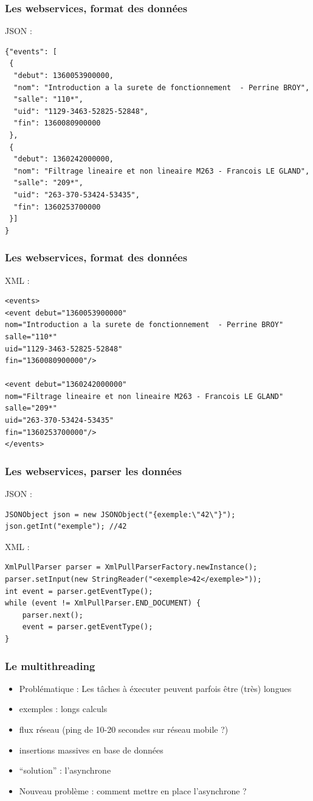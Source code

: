 \documentclass{beamer}
\begin{document}
\begin{frame}[fragile]
\frametitle{Les webservices, format des données}
JSON :
\begin{lstlisting}
{"events": [
 {
  "debut": 1360053900000,
  "nom": "Introduction a la surete de fonctionnement  - Perrine BROY",
  "salle": "110*",
  "uid": "1129-3463-52825-52848",
  "fin": 1360080900000
 },
 {
  "debut": 1360242000000,
  "nom": "Filtrage lineaire et non lineaire M263 - Francois LE GLAND",
  "salle": "209*",
  "uid": "263-370-53424-53435",
  "fin": 1360253700000
 }]
}
\end{lstlisting}
\end{frame}
\begin{frame}[fragile]
\frametitle{Les webservices, format des données}
XML :
\begin{lstlisting}
<events>
<event debut="1360053900000" 
nom="Introduction a la surete de fonctionnement  - Perrine BROY"
salle="110*" 
uid="1129-3463-52825-52848" 
fin="1360080900000"/>

<event debut="1360242000000" 
nom="Filtrage lineaire et non lineaire M263 - Francois LE GLAND"
salle="209*" 
uid="263-370-53424-53435" 
fin="1360253700000"/>
</events>
\end{lstlisting}
\end{frame}
\begin{frame}[fragile]
\frametitle{Les webservices, parser les données}
JSON :
\begin{lstlisting}
JSONObject json = new JSONObject("{exemple:\"42\"}");
json.getInt("exemple"); //42
\end{lstlisting}
XML :
\begin{lstlisting}
XmlPullParser parser = XmlPullParserFactory.newInstance();
parser.setInput(new StringReader("<exemple>42</exemple>"));
int event = parser.getEventType();
while (event != XmlPullParser.END_DOCUMENT) {
    parser.next();
    event = parser.getEventType();
}
\end{lstlisting}
\end{frame}
\begin{frame}[fragile] 
\frametitle{Le multithreading}
\begin{itemize}
  \item Problématique : Les tâches à éxecuter peuvent parfois être (très) longues
  \item exemples : longs calculs
  \item flux réseau (ping de 10-20 secondes sur réseau mobile ?)
  \item insertions massives en base de données
  \item ``solution'' : l'asynchrone
  \item Nouveau problème : comment mettre en place l'asynchrone ?
\end{itemize}
\end{frame}
\end{document}
